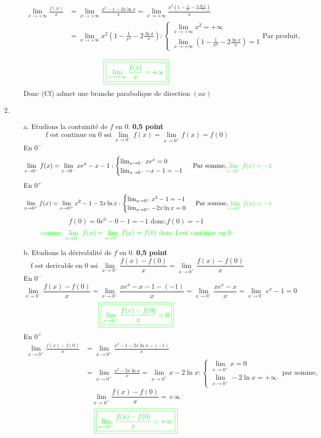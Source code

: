 \documentclass[12pt]{article}
\begin{document}
\begin{enumerate}
\begin{enumerate}
\begin{align*}
\lim_{x \to +\infty}\frac{f(x)}{x}&=\lim_{x \to +\infty}\frac{x^{2}-1-2x\ln x}{x}=\lim_{x \to +\infty}\frac{x^{2}(1-\frac{1}{x^{2}}-2\frac{\ln x}{x})}{x}\\
&=\lim_{x \to +\infty}x^{2}\left( 1-\frac{1}{x^{2}}-2\frac{\ln x}{x}\right) :
\begin{cases}
\lim_{x \to +\infty} x^{2}=+\infty\\
\lim_{x \to +\infty}\left( 1-\frac{1}{x^{2}}-2\frac{\ln x}{x}\right)=1
\end{cases}
\text{Par produit, }\\
\end{align*}
\[\textcolor{green}{\boxed{\textcolor{green}{\boxed{\lim_{x\to +\infty}\frac{f(x)}{x}=+\infty}}}}\]
Donc (Cf) admet une branche parabolique de direction $(ox)$
\end{enumerate}
\item
\begin{enumerate}
\item[a.]Etudions la contuinité de $f$ en  $0$. \textbf{ 0,5 point}
\[\text{ f est continue en 0 ssi }\lim_{x \to 0^{-}} f(x)=\lim_{x \to 0^{+}} f(x)=f(0)\]
En $0^{-}$
\[
\lim_{x \to 0^{-}}f(x)=\lim_{x \to 0^{-}}xe^{x}-x-1:
\begin{cases}
\lim_{x \to 0^{-}}xe^{x}=0\\
\lim_{x \to 0^{-}}-x-1=-1
\end{cases}
\text{ Par somme,}\textcolor{green}{\lim_{x \to 0^{-}}f(x)=-1}
\]
En $0^{+}$
\[
\lim_{x \to 0^{+}}f(x)=\lim_{x \to 0^{+}}x^{2}-1-2x\ln x:
\begin{cases}
\lim_{x \to 0^{+}}x^{2}-1=-1\\
\lim_{x \to 0^{+}}-2x\ln x=0
\end{cases}
\text{ Par somme,}\textcolor{green}{\lim_{x \to 0^{+}}f(x)=-1}
\]
\[f(0)=0e^{0}-0-1=-1 \text{ donc,} f(0)=-1\]
\[\textcolor{green}{\text{ comme }\lim_{x \to 0^{-}} f(x)=\lim_{x \to 0^{+}} f(x)=f(0)\text{ donc f est continue en 0 }}\]
\item[b.]Etudions la dérivabilité de $f$ en $0$. \textbf{ 0,5 point}
\[
\text{ f est derivable en 0 ssi }\lim_{x \to 0^{-}} \frac{f(x)-f(0)}{x}=\lim_{x \to 0^{+}} \frac{f(x)-f(0)}{x}
\]
En $0^{-}$
\[
\lim_{x \to 0^{-}} \frac{f(x)-f(0)}{x}=\lim_{x \to 0^{-}} \frac{xe^{x}-x-1-(-1)}{x}=\lim_{x \to 0^{-}} \frac{xe^{x}-x}{x}=\lim_{x \to 0^{-}} e^{x}-1=0
\]
\[\textcolor{green}{\boxed{\textcolor{green}{\boxed{\lim_{x \to 0^{-}} \frac{f(x)-f(0)}{x}=0}}}}\]
En $0^{+}$
\begin{align*}
\lim_{x \to 0^{+}} \frac{f(x)-f(0)}{x}&=\lim_{x \to 0^{+}} \frac{x^{2}-1-2x\ln x-(-1)}{x}\\
&=\lim_{x \to 0^{+}} \frac{x^{2}-2x\ln x}{x}=\lim_{x \to 0^{+}} x-2\ln x:
\begin{cases}
\lim_{x \to 0^{+}} x=0\\
\lim_{x \to 0^{+}} -2\ln x=+\infty
\end{cases}
\text{ par somme,}
\end{align*}
\[\lim_{x \to 0^{+}} \frac{f(x)-f(0)}{x}=+\infty\]
\[\textcolor{green}{\boxed{\textcolor{green}{\boxed{\lim_{x \to 0^{+}} \frac{f(x)-f(0)}{x}=+\infty}}}}\]


\end{enumerate}
\end{enumerate}
\end{document}
